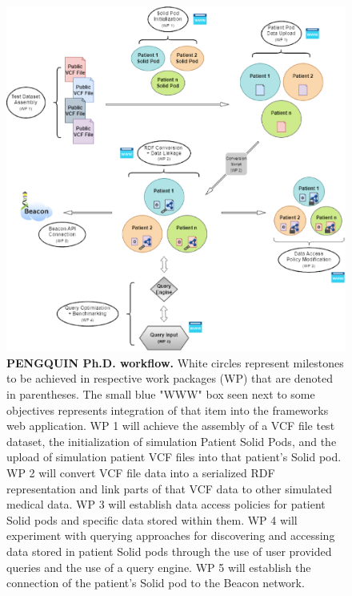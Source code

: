 \documentclass[runningheads]{llncs}
\begin{document}
\begin{figure}
\includegraphics[width=\textwidth]{fig1.eps}
\caption{\textbf{PENGQUIN Ph.D. workflow.}
White circles represent milestones to be achieved in respective work packages (WP) that are denoted in parentheses. 
The small blue "WWW" box seen next to some objectives represents integration of that item into the framework\textquotesingle s web application.
WP 1 will achieve the assembly of a VCF file test dataset, the initialization of simulation Patient Solid Pods, and the upload of simulation patient VCF files into that patient's Solid pod.
WP 2 will convert VCF file data into a serialized RDF representation and link parts of that VCF data to other simulated medical data.
WP 3 will establish data access policies for patient Solid pods and specific data stored within them.
WP 4 will experiment with querying approaches for discovering and accessing data stored in patient Solid pods through the use of user provided queries and the use of a query engine.
WP 5 will establish the connection of the patient's Solid pod to the Beacon network.
} \label{fig1}
\end{figure}

\end{document}
